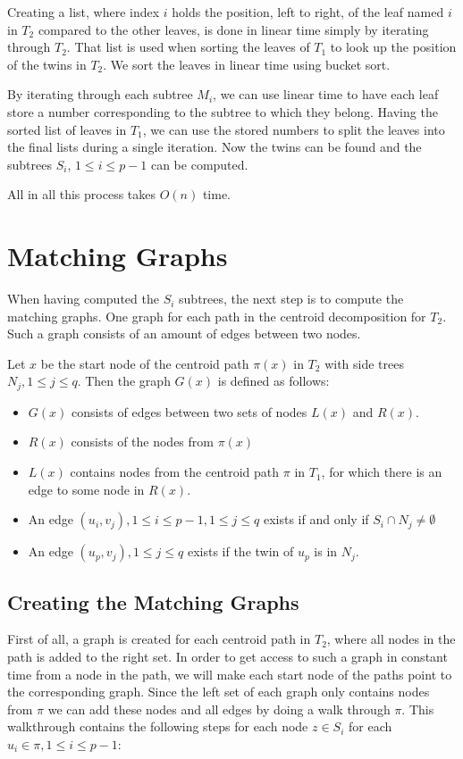 Creating a list, where index $i$ holds the position, left to right, of the leaf named $i$ in $T_2$ compared to the other leaves, is done in linear time simply by iterating through $T_2$. That list is used when sorting the leaves of $T_1$ to look up the position of the twins in $T_2$. We sort the leaves in linear time using bucket sort.

By iterating through each subtree $M_i$, we can use linear time to have each leaf store a number corresponding to the subtree to which they belong. Having the sorted list of leaves in $T_1$, we can use the stored numbers to split the leaves into the final lists during a single iteration. Now the twins can be found and the subtrees $S_i$, $1 \le i \le p-1$ can be computed.

All in all this process takes $O(n)$ time.

\section{Matching Graphs}
When having computed the $S_i$ subtrees, the next step is to compute the matching graphs. One graph for each path in the centroid decomposition for $T_2$. Such a graph consists of an amount of edges between two nodes.

Let $x$ be the start node of the centroid path $\pi(x)$ in $T_2$ with side trees $N_j, 1 \le j \le q$. Then the graph $G(x)$ is defined as follows:

\begin{itemize}
	\item $G(x)$ consists of edges between two sets of nodes $L(x)$ and $R(x)$.
	\item $R(x)$ consists of the nodes from $\pi(x)$
	\item $L(x)$ contains nodes from the centroid path $\pi$ in $T_1$, for which there is an edge to some node in $R(x)$.
	\item An edge $(u_i, v_j), 1 \le i \le p-1, 1 \le j \le q$ exists if and only if $S_i \cap N_j \ne \emptyset$
	\item An edge $(u_p, v_j), 1 \le j \le q$ exists if the twin of $u_p$ is in $N_j$.
\end{itemize}

\subsection{Creating the Matching Graphs}
First of all, a graph is created for each centroid path in $T_2$, where all nodes in the path is added to the right set. In order to get access to such a graph in constant time from a node in the path, we will make each start node of the paths point to the corresponding graph.
Since the left set of each graph only contains nodes from $\pi$ we can add these nodes and all edges by doing a walk through $\pi$. This walkthrough contains the following steps for each node $z \in S_i$ for each $u_i \in \pi, 1 \le i \le p-1$:

